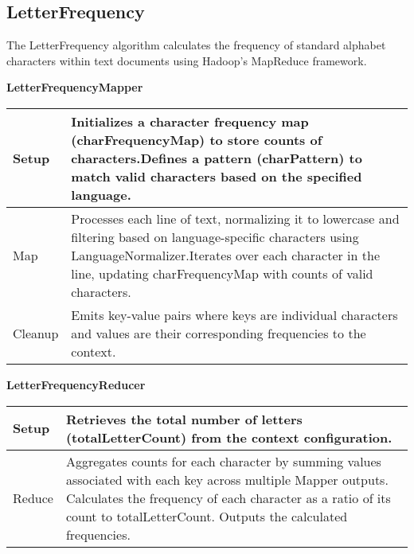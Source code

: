 \subsection{LetterFrequency}
The LetterFrequency algorithm calculates the frequency of standard alphabet characters within text documents using Hadoop's MapReduce framework.


\textbf{LetterFrequencyMapper}
\begin{longtable}{|>{\raggedright\arraybackslash}p{}|>{\raggedright\arraybackslash}p{}|}
    \hline
    Setup & Initializes a character frequency map (charFrequencyMap) to store counts of characters.Defines a pattern (charPattern) to match valid characters based on the specified language. \\
    \hline
    Map & Processes each line of text, normalizing it to lowercase and filtering based on language-specific characters using LanguageNormalizer.Iterates over each character in the line, updating charFrequencyMap with counts of valid characters.\\
    \hline
    Cleanup & Emits key-value pairs where keys are individual characters and values are their corresponding frequencies to the context.
    \\
    \hline
\end{longtable}


\textbf{LetterFrequencyReducer}
\begin{longtable}{|>{\raggedright\arraybackslash}p{}|>{\raggedright\arraybackslash}p{}|}
    \hline
    Setup & Retrieves the total number of letters (totalLetterCount) from the context configuration. \\
    \hline
    Reduce & Aggregates counts for each character by summing values associated with each key across multiple Mapper outputs.
    Calculates the frequency of each character as a ratio of its count to totalLetterCount.
    Outputs the calculated frequencies.\\
    \hline
\end{longtable}













